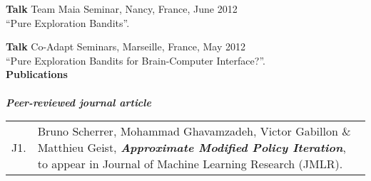 \noindent \textbf{Talk} Team Maia Seminar, Nancy, France, June 2012\\
 ``Pure Exploration Bandits''.
 
\noindent \textbf{Talk} Co-Adapt Seminars, Marseille, France,  May 2012\\
 ``Pure Exploration Bandits for Brain-Computer Interface?''.\\

\noindent\textbf{Publications}\\[-.4cm]\noindent\makebox[\linewidth]{\rule{\columnwidth}{0.4pt}}\\[.1cm]
\textit{\textbf{Peer-reviewed journal article}}\\
\noindent\begin{tabularx}{\columnwidth}{@{} l X @{}}
 J1. & Bruno Scherrer, Mohammad Ghavamzadeh, Victor Gabillon $\&$ Matthieu Geist, \textbf{\emph{Approximate Modified Policy Iteration}}, to appear in Journal of Machine Learning Research (JMLR).
  \end{tabularx}\\
  
